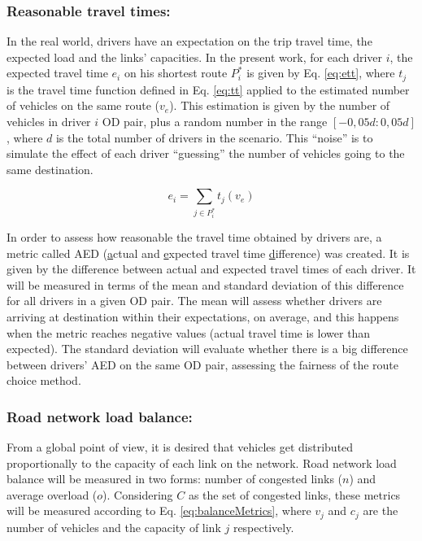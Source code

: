 \documentclass{RITA}
\newcommand{\optRoute}[1]{\ensuremath{P_#1^*}}	%
\newcommand{\travTime}{\ensuremath{t_j}} 	%
\newcommand{\linkCap}{\ensuremath{c_j}}		%
\newcommand{\veh}{\ensuremath{v}}		%
\newcommand{\ett}[1]{\ensuremath{e_#1}}		%
\newcommand{\expVeh}{\ensuremath{v_e}}		%
\begin{document}
\subsubsection{Reasonable travel times:}
\label{sec:ttMetric}
In the real world, drivers have an expectation on the trip travel time, the expected load and the links' capacities. In the present work, for each driver $i$, the expected travel time $\ett{i}$ on his shortest route \optRoute{i} is given by Eq. \eqref{eq:ett}, where $\travTime$ is the travel time function defined in Eq. \eqref{eq:tt} applied to the estimated number of vehicles on the same route ($\expVeh$). This estimation is given by the number of vehicles in driver $i$ OD pair, plus a random number in the range $[-0,05d:0,05d]$, where $d$ is the total number of drivers in the scenario. This ``noise'' is to simulate the effect of each driver ``guessing'' the number of vehicles going to the same destination.

\begin{equation}
\label{eq:ett}
\ett{i} = \sum_{j \in \optRoute{i}}\travTime(\expVeh)
\end{equation}

In order to assess how reasonable the travel time obtained by drivers are, a metric called AED (\underline{a}ctual and \underline{e}xpected travel time \underline{d}ifference) was created. It is given by the difference between actual and expected travel times of each driver. It will be measured in terms of the mean and standard deviation of this difference for all drivers in a given OD pair. The mean will assess whether drivers are arriving at destination within their expectations, on average, and this happens when the metric reaches negative values (actual travel time is lower than expected). The standard deviation will evaluate whether there is a big difference between drivers' AED on the same OD pair, assessing the fairness of the route choice method.

\subsubsection{Road network load balance:}
\label{sec:loadBalanceMetrics}
From a global point of view, it is desired that vehicles get distributed proportionally to the capacity of each link on the network. Road network load balance will be measured in two forms: number of congested links ($n$) and average overload ($o$). Considering $C$ as the set of congested links, these metrics will be measured according to Eq. \eqref{eq:balanceMetrics}, where $\veh_j$ and $\linkCap$ are the number of vehicles and the capacity of link $j$ respectively. 
\end{document}
